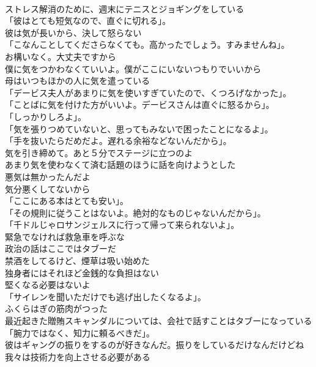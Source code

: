 \documentclass[8pt]{extreport}
\begin{document}
\begin{CJK}{UTF8}{min}
\\	ストレス解消のために、週末にテニスとジョギングをしている	
\\	「彼はとても短気なので、直ぐに切れる」。	
\\	彼は気が長いから、決して怒らない	
\\	「こなんことしてくださらなくても。高かったでしょう。すみませんね」。	
\\	お構いなく。大丈夫ですから	
\\	僕に気をつかわなくていいよ。僕がここにいないつもりでいいから	
\\	母はいつもほかの人に気を遣っている	
\\	「デービス夫人があまりに気を使いすぎていたので、くつろげなかった」。	
\\	「ことばに気を付けた方がいいよ。デービスさんは直ぐに怒るから」。	
\\	「しっかりしろよ」。	
\\	「気を張りつめていないと、思ってもみないで困ったことになるよ」。	
\\	「手を抜いたらだめだよ。遅れる余裕などないんだから」。	
\\	気を引き締めて。あと５分でステージに立つのよ	
\\	あまり気を使わなくて済む話題のほうに話を向けようとした	
\\	悪気は無かったんだよ 
\\	気分悪くしてないから	
\\	「ここにある本はとても安い」。	
\\	「その規則に従うことはないよ。絶対的なものじゃないんだから」。	
\\	「千ドルじゃロサンジェルスに行って帰って来られないよ」。	
\\	緊急でなければ救急車を呼ぶな	
\\	政治の話はここではタブーだ	
\\	禁酒をしてるけど、煙草は吸い始めた	
\\	独身者にはそれほど金銭的な負担はない	
\\	堅くなる必要はないよ	
\\	「サイレンを聞いただけでも逃げ出したくなるよ」。	
\\	ふくらはぎの筋肉がつった	
\\	最近起きた贈賄スキャンダルについては、会社で話すことはタブーになっている	
\\	「腕力ではなく、知力に頼るべきだ」。	
\\	彼はギャングの振りをするのが好きなんだ。振りをしているだけなんだけどね	
\\	我々は技術力を向上させる必要がある	

\end{CJK}
\end{document}
